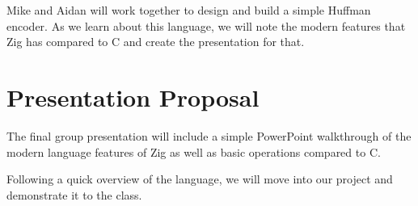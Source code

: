 \documentclass{article}
\begin{document}
Mike and Aidan will work together to design and build a simple Huffman encoder. As we learn about this language, we will note the modern features that Zig has compared to C and create the presentation for that.

\section{Presentation Proposal}
The final group presentation will include a simple PowerPoint walkthrough of the modern language features of Zig as well as basic operations compared to C.

Following a quick overview of the language, we will move into our project and demonstrate it to the class.
\end{document}
